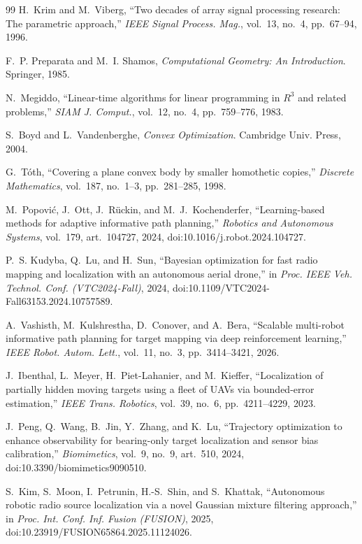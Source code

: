 \documentclass[journal,10pt]{IEEEtran}
\theoremstyle{definition}
\begin{document}
\begin{thebibliography}{99}
H.~Krim and M.~Viberg, ``Two decades of array signal processing research: The parametric
approach,'' \emph{IEEE Signal Process. Mag.}, vol.~13, no.~4, pp.~67--94, 1996.

F.~P. Preparata and M.~I. Shamos, \emph{Computational Geometry: An Introduction}. Springer, 1985.

N.~Megiddo, ``Linear-time algorithms for linear programming in $R^3$ and related problems,''
\emph{SIAM J. Comput.}, vol.~12, no.~4, pp.~759--776, 1983.

S.~Boyd and L.~Vandenberghe, \emph{Convex Optimization}. Cambridge Univ. Press, 2004.

G.~T\'oth, ``Covering a plane convex body by smaller homothetic copies,''
\emph{Discrete Mathematics}, vol.~187, no.~1--3, pp.~281--285, 1998.

M.~Popovi\'c, J.~Ott, J.~R\"uckin, and M.~J.~Kochenderfer, ``Learning-based methods for adaptive
informative path planning,'' \emph{Robotics and Autonomous Systems}, vol.~179, art.~104727, 2024,
doi:10.1016/j.robot.2024.104727.

P.~S. Kudyba, Q.~Lu, and H.~Sun, ``Bayesian optimization for fast radio mapping and
localization with an autonomous aerial drone,'' in \emph{Proc. IEEE Veh. Technol. Conf.
(VTC2024-Fall)}, 2024, doi:10.1109/VTC2024-Fall63153.2024.10757589.

A.~Vashisth, M.~Kulshrestha, D.~Conover, and A.~Bera, ``Scalable multi-robot informative path
planning for target mapping via deep reinforcement learning,'' \emph{IEEE Robot. Autom. Lett.},
vol.~11, no.~3, pp.~3414--3421, 2026.

J.~Ibenthal, L.~Meyer, H.~Piet-Lahanier, and M.~Kieffer, ``Localization of partially hidden
moving targets using a fleet of UAVs via bounded-error estimation,'' \emph{IEEE Trans.
Robotics}, vol.~39, no.~6, pp.~4211--4229, 2023.

J.~Peng, Q.~Wang, B.~Jin, Y.~Zhang, and K.~Lu, ``Trajectory optimization to enhance
observability for bearing-only target localization and sensor bias calibration,''
\emph{Biomimetics}, vol.~9, no.~9, art.~510, 2024, doi:10.3390/biomimetics9090510.

S.~Kim, S.~Moon, I.~Petrunin, H.-S.~Shin, and S.~Khattak, ``Autonomous robotic radio source
localization via a novel Gaussian mixture filtering approach,'' in \emph{Proc. Int. Conf.
Inf. Fusion (FUSION)}, 2025, doi:10.23919/FUSION65864.2025.11124026.

\end{thebibliography}
\end{document}
